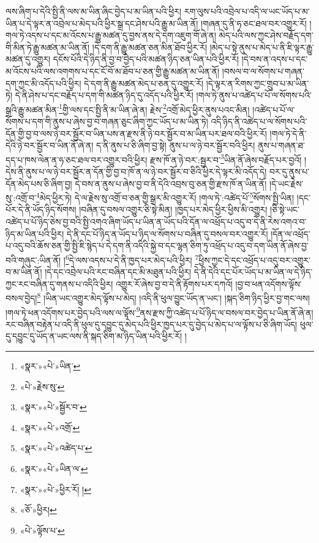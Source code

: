 ལས་ཞིག་པ་དེའི་སྤྱི་ནི་ལས་མ་ཡིན་ཞིང་བྱེད་པ་མ་ཡིན་པའི་ཕྱིར། རག་ལུས་པའི་འབྲེལ་པ་འདི་ལ་ཡང་ཡོད་པ་མ་ཡིན་པ་དེ་ལྟར་ན་འབྲེལ་པ་མེད་པའི་ཕྱིར་སྒྲ་དང་ཤེས་པའི་རྒྱུ་མ་ཡིན་ནོ། །གཞན་དུ་ནི་ཧ་ཅང་ཐལ་བར་འགྱུར་རོ། །གལ་ཏེ་འདས་པ་དང་མ་འོངས་པ་རྒྱུ་མཚན་དུ་བྱས་ནས་དེ་དག་འཇུག་གོ་ཞེ་ན། མེད་པའི་ལས་ཀྱང་ཤེས་བརྗོད་དག་གི་མིན་ཏེ་རྒྱུ་མཚན་མ་ཡིན་ནོ། །དེ་དག་ནི་རྒྱུ་མཚན་ཅན་མིན་ཐོབ་ཕྱིར་རོ། །མེད་པ་སྟེ་ནུས་པ་མེད་པ་ནི་ཇི་ལྟར་རྒྱུ་མཚན་དུ་འགྱུར། དངོས་པོའི་དེ་ཉིད་ནི་བྱ་བ་བྱེད་པའི་མཚན་ཉིད་ཅན་ཡིན་པའི་ཕྱིར་རོ། །དེ་བས་ན་འདས་པ་དང་མ་འོངས་པའི་ལས་འགགས་པ་དང་ངོ་བོ་མ་ཐོབ་པ་ཅན་གྱི་རྒྱུ་མཚན་མ་ཡིན་ནོ། །བསལ་བ་ལ་སོགས་པ་གཞན་དག་ཀྱང་མི་འདོད་པའི་ཕྱིར། དེ་དག་ནི་རྒྱུ་མཚན་མེད་པ་ཅན་དུ་འགྱུར་རོ། །དེ་ལྟར་ན་རིགས་ཀྱང་གྲུབ་པ་མ་ཡིན་ཏེ། དེ་ནི་ཤེས་པ་དང་བརྗོད་པ་དག་གི་མཚན་ཉིད་དུ་འདོད་པའི་ཕྱིར་རོ། །གལ་ཏེ་ནུས་པ་འཚེད་པ་པོ་ལ་སོགས་པའི་སྒྲའི་རྒྱུ་མཚན་མིན་\footnote{«སྣར་»«པེ་»ཡིན་}གྱི་ལས་དང་སྤྱི་ནི་མ་ཡིན་ཞེ་ན། རྗེས་\footnote{«པེ་»རྗེས་སུ་}འགྲོ་མེད་ཕྱིར་ནུས་པའང་མིན། །འཚེད་པ་པོ་ལ་སོགས་པ་དག་གི་ནུས་པ་ཞེས་བྱ་བ་གཞན་ཅུང་ཞིག་ཀྱང་ཡོད་པ་མ་ཡིན་ཏེ། འདི་ཉིད་ནི་འཚེད་པ་ལ་སོགས་པའི་དོན་གྱི་བྱ་བ་ལས་ཉེ་བར་སྦྱོར་བ་ཡིན་པས་ན་རྫས་ནི་ཉེ་བར་སྦྱོར་བ་མ་ཡིན་པར་ཐལ་བའི་ཕྱིར་རོ། །གལ་ཏེ་དེ་ནི་དེའི་ཉེ་བར་སྦྱོར་བ་ཡིན་ནོ་ཞེ་ན། ད་ནི་ནུས་པ་ཅི་ཞིག་བྱ་སྟེ། ནུས་པ་ལ་ཉེ་བར་སྦྱོར་བའི་ཕྱིར། ནུས་པ་གཞན་ཐ་དད་པ་ཁས་ལེན་ན་ཧ་ཅང་ཐལ་བར་འགྱུར་བའི་ཕྱིར། རྫས་ཁོ་ན་ཉེ་བར་:སྦྱར་བ་\footnote{«སྣར་»«པེ་»སྦྱོར་བ་}ཡིན་ནོ་ཞེས་བརྗོད་པར་བྱའོ། །དེས་ནི་ནུས་པ་ལ་ཉེ་བར་སྦྱོར་ན་དོན་གྱི་བྱ་བ་ཁོ་ན་ལ་ཉེ་བར་སྦྱོར་བ་ཅིའི་ཕྱིར་དེ་ལྟར་མི་འདོད་དེ། བར་དུ་ནུས་པ་དོན་མེད་པས་ཅི་ཞིག་བྱ། དེ་བས་ན་ནུས་པ་ཞེས་བྱ་བ་ནི་དེའི་འབྲས་བུ་ཅན་གྱི་རྫས་ཁོ་ན་ཡིན་ནོ། །དེ་ཡང་རྗེས་སུ་:འགྲོ་བ་\footnote{«སྣར་»«པེ་»འགྲོ་}མེད་ཕྱིར་ཏེ། དེ་ལ་རྗེས་སུ་འགྲོ་བ་ཅན་གྱི་སྒྲར་མི་འགྱུར་རོ། །གལ་ཏེ་:འཚེད་པོ་\footnote{«སྣར་»«པེ་»འཚེད་པ་}སོགས་སྤྱི་ཡིན། །དང་པོར་དེ་ནི་ཡོད་ཉིད་སོགས། །བཞིན་དུ་བསལ་འགྱུར་ཅི་སྟེ་མིན། །ཁྱད་པར་མེད་ཕྱིར་ཕྱིས་མི་འགྱུར། །ཅི་སྟེ་ཡང་འཚེད་པ་པོ་ཉིད་ཅེས་བྱ་བའི་སྤྱི་འགའ་ཞིག་ཡོད་པ་ཡིན་ན་ཡོད་པའི་དོན་ལ་འཕྲོད་པ་འདུ་བ་དེ་ནི་རེས་འགའ་བ་ཉིད་མ་ཡིན་པའི་ཕྱིར། དེ་ནི་དང་པོ་ཉིད་ན་ཡོད་པ་ཉིད་ལ་སོགས་པ་བཞིན་དུ་བསལ་བར་འགྱུར་རོ། །དོན་ལ་འཕྲོད་པ་འདུ་བའི་ཆོས་ཅན་གྱི་སྤྱི་ཇི་སྙེད་པ་དེ་དག་ནི་འདིའི་སྐྱེ་བ་དང་ལྷན་ཅིག་ཏུ་འཕྲོད་པ་འདུ་བ་དག་ཡིན་ནོ་ཞེས་བྱ་བའི་གཞུང་:ཡིན་ནོ། །\footnote{«སྣར་»«པེ་»ཡིན་ལ་}དེ་ལས་འདས་པ་དེ་ནི་ཁྱད་པར་མེད་པའི་ཕྱིར། \footnote{«སྣར་»«པེ་»ཕྱིར་རོ། ། }ཕྱིས་ཀྱང་དེ་དང་འཕྲོད་པ་འདུ་བར་འགྱུར་བ་མ་ཡིན་ནོ། །དེ་དང་འབྲེལ་པའི་རང་བཞིན་དང་མི་མཐུན་པའི་ཕྱིར། དེ་ནི་དེའི་དང་པོར་ཡོད་པ་མ་ཡིན་ལ་དེ་ཉིད་ཀྱང་རང་བཞིན་དུ་གནས་པ་འདིའི་ཕྱིར། འགྱུར་རོ་ཞེས་བྱ་བ་དེ་ནི་རྟོགས་པར་དཀའོ། །བྱ་བ་ཕན་འདོགས་ལྟོས་བསལ་བྱེད།\footnote{«ཅོ་»ཕྱིར།} །ཡིན་ཡང་འགྱུར་མེད་ལྟོས་པ་མེད། །འདི་ནི་ཕུལ་བྱུང་ཡོད་ན་ཡང་། །སྐད་ཅིག་ཉིད་ཕྱིར་བྱ་གང་ལས། །གལ་ཏེ་ཕན་འདོགས་པར་བྱེད་པའི་ལས་ལ་ལྟོས་\footnote{«པེ་»ལྟོས་པ་}ནས་རྫས་ཀྱི་འཚེད་པ་པོ་ཉིད་ལ་བསལ་བར་བྱེད་པ་ཡིན་ནོ་ཞེ་ན། རང་བཞིན་བརྟེན་པ་འདི་ནི་ཕུལ་དུ་དབྱུང་དུ་མེད་པའི་ཕྱིར་ཁྱད་པར་དུ་བྱེད་པ་མེད་པ་ལ་ལྟོས་པ་ཅི་ཞིག་ཡོད། ཕུལ་དུ་དབྱུང་དུ་ཡོད་ན་ཡང་ལས་ནི་སྐད་ཅིག་མ་ཉིད་ཡིན་པའི་ཕྱིར་རོ། །
